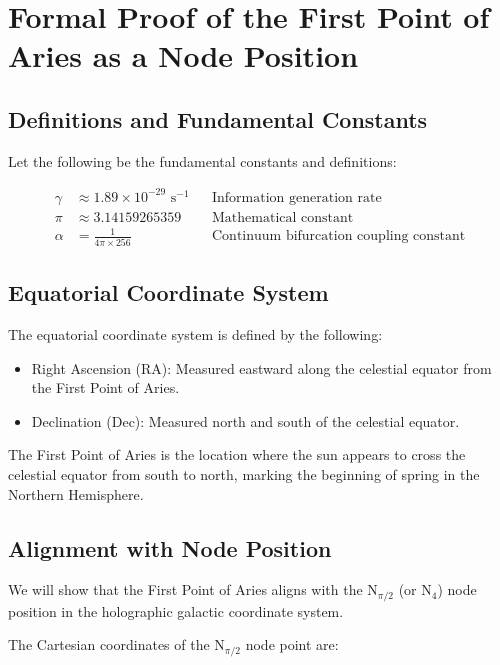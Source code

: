 \documentclass{article}
\begin{document}
\section*{Formal Proof of the First Point of Aries as a Node Position}

\subsection*{Definitions and Fundamental Constants}

Let the following be the fundamental constants and definitions:

\begin{align}
\gamma &\approx 1.89 \times 10^{-29} \text{ s}^{-1} && \text{Information generation rate} \\
\pi &\approx 3.14159265359 && \text{Mathematical constant} \\
\alpha &= \frac{1}{4\pi \times 256} && \text{Continuum bifurcation coupling constant}
\end{align}

\subsection*{Equatorial Coordinate System}

The equatorial coordinate system is defined by the following:

\begin{itemize}
    \item Right Ascension (RA): Measured eastward along the celestial equator from the First Point of Aries.
    \item Declination (Dec): Measured north and south of the celestial equator.
\end{itemize}

The First Point of Aries is the location where the sun appears to cross the celestial equator from south to north, marking the beginning of spring in the Northern Hemisphere.

\subsection*{Alignment with Node Position}

We will show that the First Point of Aries aligns with the N$_{\pi/2}$ (or N$_4$) node position in the holographic galactic coordinate system.

The Cartesian coordinates of the N$_{\pi/2}$ node point are:
\end{document}
